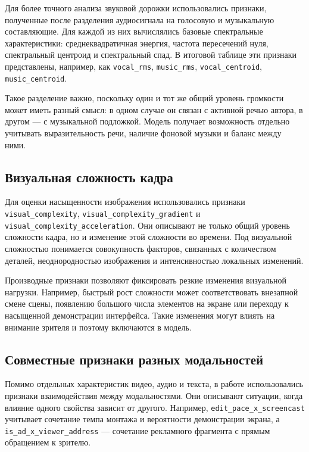 \documentclass[times]{itmo-student-thesis}
\begin{document}
Для более точного анализа звуковой дорожки использовались признаки, полученные после разделения аудиосигнала на голосовую и музыкальную составляющие. Для каждой из них вычислялись базовые спектральные характеристики: среднеквадратичная энергия, частота пересечений нуля, спектральный центроид и спектральный спад. В итоговой таблице эти признаки представлены, например, как \texttt{vocal\_rms}, \texttt{music\_rms}, \texttt{vocal\_centroid}, \texttt{music\_centroid}.

Такое разделение важно, поскольку один и тот же общий уровень громкости может иметь разный смысл: в одном случае он связан с активной речью автора, в другом — с музыкальной подложкой. Модель получает возможность отдельно учитывать выразительность речи, наличие фоновой музыки и баланс между ними.

\subsection{Визуальная сложность кадра}

Для оценки насыщенности изображения использовались признаки \texttt{visual\_complexity}, \texttt{visual\_complexity\_gradient} и \texttt{visual\_complexity\_acceleration}. Они описывают не только общий уровень сложности кадра, но и изменение этой сложности во времени. Под визуальной сложностью понимается совокупность факторов, связанных с количеством деталей, неоднородностью изображения и интенсивностью локальных изменений.

Производные признаки позволяют фиксировать резкие изменения визуальной нагрузки. Например, быстрый рост сложности может соответствовать внезапной смене сцены, появлению большого числа элементов на экране или переходу к насыщенной демонстрации интерфейса. Такие изменения могут влиять на внимание зрителя и поэтому включаются в модель.

\subsection{Совместные признаки разных модальностей}

Помимо отдельных характеристик видео, аудио и текста, в работе использовались признаки взаимодействия между модальностями. Они описывают ситуации, когда влияние одного свойства зависит от другого. Например, \texttt{edit\_pace\_x\_screencast} учитывает сочетание темпа монтажа и вероятности демонстрации экрана, а \texttt{is\_ad\_x\_viewer\_address} — сочетание рекламного фрагмента с прямым обращением к зрителю.
\end{document}
